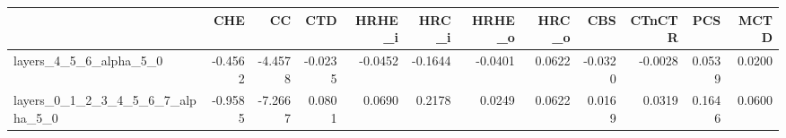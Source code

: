 \begin{tabular}{lrrrrrrrrrrr}
\toprule
 & CHE & CC & CTD & HRHE_i & HRC_i & HRHE_o & HRC_o & CBS & CTnCTR & PCS & MCTD \\
\midrule
layers_4_5_6_alpha_5_0 & -0.4562 & -4.4578 & -0.0235 & -0.0452 & -0.1644 & -0.0401 & 0.0622 & -0.0320 & -0.0028 & 0.0539 & 0.0200 \\
layers_0_1_2_3_4_5_6_7_alpha_5_0 & -0.9585 & -7.2667 & 0.0801 & 0.0690 & 0.2178 & 0.0249 & 0.0622 & 0.0169 & 0.0319 & 0.1646 & 0.0600 \\
\bottomrule
\end{tabular}
